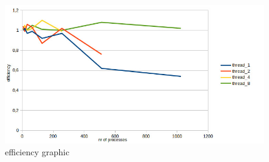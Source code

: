 \documentclass[10pt]{article}
\begin{document}
\begin{multicols}{2}
\begin{figure}[H]
  \includegraphics[scale=0.3]{img/efficiency.jpg}
  \centering
  \caption{efficiency graphic}
\end{figure}

\end{multicols}



\end{document}
